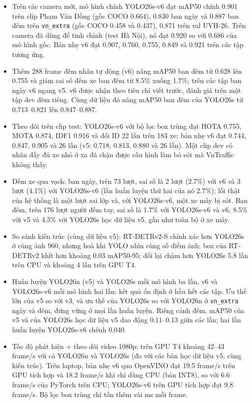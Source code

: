 \begin{itemize}
  \item Trên các camera mới, mô hình chính YOLO26s-v6 đạt mAP50 chính 0.901 trên clip Phạm Văn Đồng (gốc COCO 0.664),
        0.830 ban ngày và 0.887 ban đêm trên \texttt{vn\_extra} (gốc COCO 0.458 và 0.437), 0.871 trên val UVH-26. Trên
        camera đã dùng để tinh chỉnh (test Hà Nội), nó đạt 0.920 so với 0.686 của mô hình gốc. Bản nhẹ v6 đạt 0.907,
        0.760, 0.755, 0.849 và 0.921 trên các tập tương ứng.
  \item Thêm 288 frame đêm nhãn tự động (v6) nâng mAP50 ban đêm từ 0.628 lên 0.755 và giảm sai số đếm xe ban đêm từ
        8.5\% xuống 1.7\%; trên các tập ban ngày v6 ngang v5. v6 được nhận theo tiêu chí viết trước, đánh giá trên một
        tập dev đêm riêng. Cùng dữ liệu đó nâng mAP50 ban đêm của YOLO26s từ 0.713--0.821 lên 0.847--0.887.
  \item Theo dõi trên clip test: YOLO26s-v6 với bộ lọc box trùng đạt HOTA 0.755, MOTA 0.874, IDF1 0.916 và đổi ID 22
        lần trên 183 xe; bản nhẹ v6 đạt 0.744, 0.847, 0.905 và 26 lần (v5: 0.718, 0.813, 0.880 và 26 lần). Một clip dev
        có nhãn đầy đủ xe nhỏ ở xa đã chặn được cấu hình làm bỏ sót mà VnTraffic không thấy.
  \item Đếm xe qua vạch: ban ngày, trên 73 lượt, sai số là 2 lượt (2.7\%) với v6 và 3 lượt (4.1\%) với YOLO26s-v6 (lần
        huấn luyện thứ hai của nó 2.7\%); lỗi thật của hệ thống là một lượt sai lớp và, với YOLO26s-v6, một xe máy bị
        sót. Ban đêm, trên 176 lượt người đếm tay, sai số là 1.7\% với YOLO26s-v6 và v6, 8.5\% với v5 và 4.5\% với
        YOLO26s học dữ liệu v5, gần như toàn bộ ở xe máy.
  \item So sánh kiến trúc (cùng dữ liệu v5): RT-DETRv2-S chính xác hơn YOLO26s ở cùng ảnh 960, nhưng hoà khi YOLO nhìn
        cùng số điểm ảnh; box của RT-DETRv2 khít hơn khoảng 0.03 mAP50-95; đổi lại chậm hơn YOLO26s 5.8 lần trên CPU và
        khoảng 4 lần trên GPU T4.
  \item Huấn luyện YOLO26n (v5) và YOLO26s mỗi mô hình ba lần, v6 và YOLO26s-v6 mỗi mô hình hai lần: kết quả ổn định ở
        hầu hết các tập. Ưu thế lớn của v5 so với v3, và ưu thế của YOLO26s so với YOLO26n ở \texttt{vn\_extra} ngày và
        đêm, đứng vững ở mọi lần huấn luyện. Riêng cảnh đêm, mAP50 của v5 và của YOLO26s học dữ liệu v5 dao động
        0.11--0.13 giữa các lần; hai lần huấn luyện YOLO26s-v6 chênh 0.040.
  \item Tốc độ phát hiện + theo dõi video 1080p: trên GPU T4 khoảng 42--43 frame/s với cả YOLO26n và YOLO26s (đo với
        các bản học dữ liệu v5, cùng kiến trúc). Trên laptop, bản nhẹ v6 qua OpenVINO đạt 19.5 frame/s trên GPU tích hợp
        và 18.2 frame/s khi chỉ dùng CPU (bản INT8), so với 6.6 frame/s của PyTorch trên CPU; YOLO26s-v6 trên GPU tích
        hợp đạt 9.8 frame/s. Bộ lọc box trùng chỉ tốn thêm vài ms mỗi frame.
\end{itemize}

